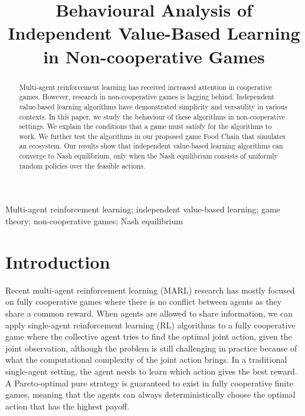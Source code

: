 \documentclass[]{interact}
\theoremstyle{plain}%
\theoremstyle{definition}
\theoremstyle{remark}
\begin{document}

\title{Behavioural Analysis of Independent Value-Based Learning in Non-cooperative Games}

\author{
}

\maketitle

\begin{abstract}
Multi-agent reinforcement learning has received increased attention in cooperative games. However, research in non-cooperative games is lagging behind. Independent value-based learning algorithms have demonstrated simplicity and versatility in various contexts. In this paper, we study the behaviour of these algorithms in non-cooperative settings. We explain the conditions that a game must satisfy for the algorithms to work. We further test the algorithms in our proposed game Food Chain that simulates an ecosystem. Our results show that independent value-based learning algorithms can converge to Nash equilibrium, only when the Nash equilibrium consists of uniformly random policies over the feasible actions.
\end{abstract}

\begin{keywords}
Multi-agent reinforcement learning; independent value-based learning; game theory; non-cooperative games; Nash equilibrium
\end{keywords}

\section{Introduction}
Recent multi-agent reinforcement learning (MARL) research has mostly focused on fully cooperative games \cite{yu2020benchmarking, papoudakis2020benchmarking, zhu2024survey} where there is no conflict between agents as they share a common reward. When agents are allowed to share information, we can apply single-agent reinforcement learning (RL) algorithms to a fully cooperative game where the collective agent tries to find the optimal joint action, given the joint observation, although the problem is still challenging in practice because of what the computational complexity of the joint action brings. In a traditional single-agent setting, the agent needs to learn which action gives the best reward. A Pareto-optimal pure strategy is guaranteed to exist in fully cooperative finite games, meaning that the agents can always deterministically choose the optimal action that has the highest payoff.
\end{document}

